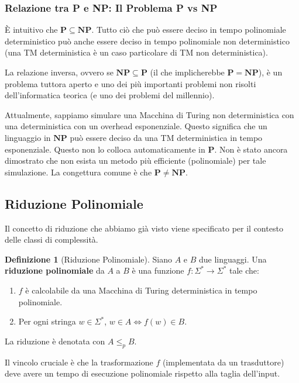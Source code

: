 \documentclass[a4paper]{article}
\theoremstyle{definition} %
\newtheorem{definition}{Definizione}
\begin{document}
\subsubsection{Relazione tra P e NP: Il Problema P vs NP}

È intuitivo che $\mathbf{P} \subseteq \mathbf{NP}$. Tutto ciò che può essere deciso in tempo polinomiale deterministico può anche essere deciso in tempo polinomiale non deterministico (una TM deterministica è un caso particolare di TM non deterministica).

La relazione inversa, ovvero se $\mathbf{NP} \subseteq \mathbf{P}$ (il che implicherebbe $\mathbf{P} = \mathbf{NP}$), è un problema tuttora aperto e uno dei più importanti problemi non risolti dell'informatica teorica (e uno dei problemi del millennio).

Attualmente, sappiamo simulare una Macchina di Turing non deterministica con una deterministica con un overhead esponenziale. Questo significa che un linguaggio in $\mathbf{NP}$ può essere deciso da una TM deterministica in tempo esponenziale. Questo non lo colloca automaticamente in $\mathbf{P}$. Non è stato ancora dimostrato che non esista un metodo più efficiente (polinomiale) per tale simulazione. La congettura comune è che $\mathbf{P} \ne \mathbf{NP}$.

\subsection{Riduzione Polinomiale}

Il concetto di riduzione che abbiamo già visto viene specificato per il contesto delle classi di complessità.

\begin{definition}[Riduzione Polinomiale]
Siano $A$ e $B$ due linguaggi. Una \textbf{riduzione polinomiale} da $A$ a $B$ è una funzione $f: \Sigma^* \to \Sigma^*$ tale che:
\begin{enumerate}
    \item $f$ è calcolabile da una Macchina di Turing deterministica in tempo polinomiale.
    \item Per ogni stringa $w \in \Sigma^*$, $w \in A \iff f(w) \in B$.
\end{enumerate}
La riduzione è denotata con $A \le_p B$.
\end{definition}
Il vincolo cruciale è che la trasformazione $f$ (implementata da un trasduttore) deve avere un tempo di esecuzione polinomiale rispetto alla taglia dell'input.
\end{document}
